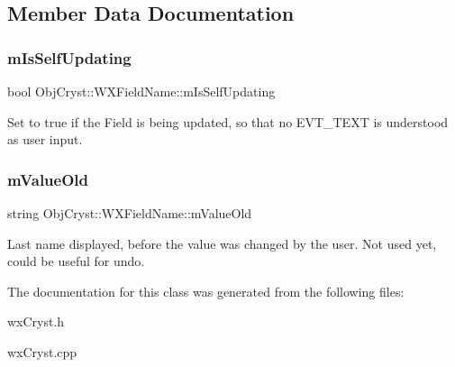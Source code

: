 \subsection{Member Data Documentation}
\mbox{\label{class_obj_cryst_1_1_w_x_field_name_a55d08ae80f82be85b66e66c4ded8eeb5}} 
\subsubsection{\texorpdfstring{mIsSelfUpdating}{mIsSelfUpdating}}
{\footnotesize\ttfamily bool Obj\+Cryst\+::\+W\+X\+Field\+Name\+::m\+Is\+Self\+Updating\hspace{0.3cm}{\ttfamily [protected]}}

Set to true if the Field is being updated, so that no \textquotesingle{}E\+V\+T\+\_\+\+T\+E\+XT\textquotesingle{} is understood as user input. \mbox{\label{class_obj_cryst_1_1_w_x_field_name_a4df82f08ebf86ee9cbc981c57a197202}} 
\subsubsection{\texorpdfstring{mValueOld}{mValueOld}}
{\footnotesize\ttfamily string Obj\+Cryst\+::\+W\+X\+Field\+Name\+::m\+Value\+Old\hspace{0.3cm}{\ttfamily [protected]}}

Last name displayed, before the value was changed by the user. Not used yet, could be useful for undo. 

The documentation for this class was generated from the following files\+:\begin{DoxyCompactItemize}
\item 
wx\+Cryst.\+h\item 
wx\+Cryst.\+cpp\end{DoxyCompactItemize}
